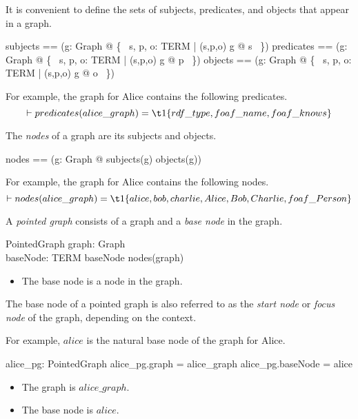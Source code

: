 \documentclass{article}
\begin{document}
It is convenient to define the sets of subjects, predicates, and objects that appear in a graph.
\begin{zed}
subjects == (\lambda g: Graph @ \{~ s, p, o: TERM | (s,p,o) \in g @ s ~\})
\also
predicates == (\lambda g: Graph @ \{~ s, p, o: TERM | (s,p,o) \in g @ p ~\})
\also
objects == (\lambda g: Graph @ \{~ s, p, o: TERM | (s,p,o) \in g @ o ~\}) 
\end{zed}

For example, the graph for Alice contains the following predicates.
\[\vdash 
	predicates(alice\_graph) = \\
\t1		\{ rdf\_type, foaf\_name, foaf\_knows \}
\]

The {\em nodes} of a graph are its subjects and objects.
\begin{zed}
nodes == (\lambda g: Graph @ subjects(g) \cup objects(g))
\end{zed}

For example, the graph for Alice contains the following nodes.
\[\vdash 
	nodes(alice\_graph) = \\
\t1		\{ alice, bob, charlie, Alice, Bob, Charlie, foaf\_Person \}
\]

A {\em pointed graph} consists of a graph and a {\em base node} in the graph.
\begin{schema}{PointedGraph}
	graph: Graph \\
	baseNode: TERM
\where
	baseNode \in nodes(graph)
\end{schema}
\begin{itemize}
\item The base node is a node in the graph.
\end{itemize}

The base node of a pointed graph is also referred to as the {\em start node} or {\em focus node} of the graph, depending on the context.

For example, $alice$ is the natural base node of the graph for Alice.
\begin{axdef}
	alice\_pg: PointedGraph
\where
	alice\_pg.graph = alice\_graph
\also
	alice\_pg.baseNode = alice
\end{axdef}
\begin{itemize}
\item The graph is $alice\_graph$.
\item The base node is $alice$.
\end{itemize}
\end{document}
